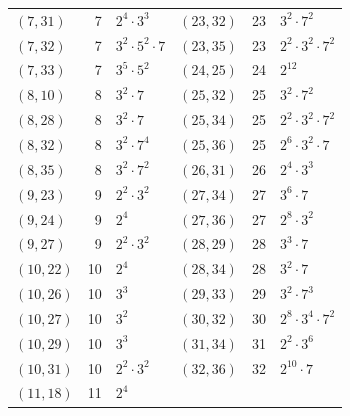 \documentclass[11pt]{article}
\begin{document}
\begin{longtable}{@{}lrl@{\qquad}lrl@{}}
$(7,31)$ & 7 & $2^{4}\cdot 3^{3}$ & $(23,32)$ & 23 & $3^{2}\cdot 7^{2}$\\
$(7,32)$ & 7 & $3^{2}\cdot 5^{2}\cdot 7$ & $(23,35)$ & 23 & $2^{2}\cdot 3^{2}\cdot 7^{2}$\\
$(7,33)$ & 7 & $3^{5}\cdot 5^{2}$ & $(24,25)$ & 24 & $2^{12}$\\
$(8,10)$ & 8 & $3^{2}\cdot 7$ & $(25,32)$ & 25 & $3^{2}\cdot 7^{2}$\\
$(8,28)$ & 8 & $3^{2}\cdot 7$ & $(25,34)$ & 25 & $2^{2}\cdot 3^{2}\cdot 7^{2}$\\
$(8,32)$ & 8 & $3^{2}\cdot 7^{4}$ & $(25,36)$ & 25 & $2^{6}\cdot 3^{2}\cdot 7$\\
$(8,35)$ & 8 & $3^{2}\cdot 7^{2}$ & $(26,31)$ & 26 & $2^{4}\cdot 3^{3}$\\
$(9,23)$ & 9 & $2^{2}\cdot 3^{2}$ & $(27,34)$ & 27 & $3^{6}\cdot 7$\\
$(9,24)$ & 9 & $2^{4}$ & $(27,36)$ & 27 & $2^{8}\cdot 3^{2}$\\
$(9,27)$ & 9 & $2^{2}\cdot 3^{2}$ & $(28,29)$ & 28 & $3^{3}\cdot 7$\\
$(10,22)$ & 10 & $2^{4}$ & $(28,34)$ & 28 & $3^{2}\cdot 7$\\
$(10,26)$ & 10 & $3^{3}$ & $(29,33)$ & 29 & $3^{2}\cdot 7^{3}$\\
$(10,27)$ & 10 & $3^{2}$ & $(30,32)$ & 30 & $2^{8}\cdot 3^{4}\cdot 7^{2}$\\
$(10,29)$ & 10 & $3^{3}$ & $(31,34)$ & 31 & $2^{2}\cdot 3^{6}$\\
$(10,31)$ & 10 & $2^{2}\cdot 3^{2}$ & $(32,36)$ & 32 & $2^{10}\cdot 7$\\
$(11,18)$ & 11 & $2^{4}$ & & &\\
\end{longtable}
\endgroup
\end{document}
